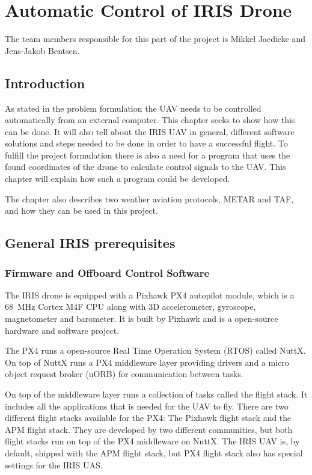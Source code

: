 \section{Automatic Control of IRIS Drone}
The team members responsible for this part of the project is Mikkel Jaedicke and Jens-Jakob Bentsen.
\subsection{Introduction}
As stated in the problem formulation the UAV needs to be controlled automatically from an external computer. This chapter seeks to show how this can be done. It will also tell about the IRIS UAV in general, different software solutions and steps needed to be done in order to have a successful flight. To fulfill the project formulation there is also a need for a program that uses the found coordinates of the drone to calculate control signals to the UAV. This chapter will explain how such a program could be developed. 

The chapter also describes two weather aviation protocols, METAR and TAF, and how they can be used in this project.

\subsection{General IRIS prerequisites}
\subsubsection{Firmware and Offboard Control Software}
The IRIS drone is equipped with a Pixhawk PX4 autopilot module, which is a \SI{68}{\mega\hertz} Cortex M4F CPU along with 3D accelerometer, gyroscope, magnetometer and barometer. It is built by Pixhawk and is a open-source hardware and software project.

The PX4 runs a open-source Real Time Operation System (RTOS) called NuttX. On top of NuttX runs a PX4 middleware layer providing drivers and a micro object request broker (uORB) for communication between tasks.

On top of the middleware layer runs a collection of tasks called the flight stack. It includes all the applications that is needed for the UAV to fly. There are two different flight stacks available for the PX4: The Pixhawk flight stack and the APM flight stack. They are developed by two different communities, but both flight stacks run on top of the PX4 middleware on NuttX. The IRIS UAV is, by default, shipped with the APM flight stack, but PX4 flight stack also has special settings for the IRIS UAS. 


